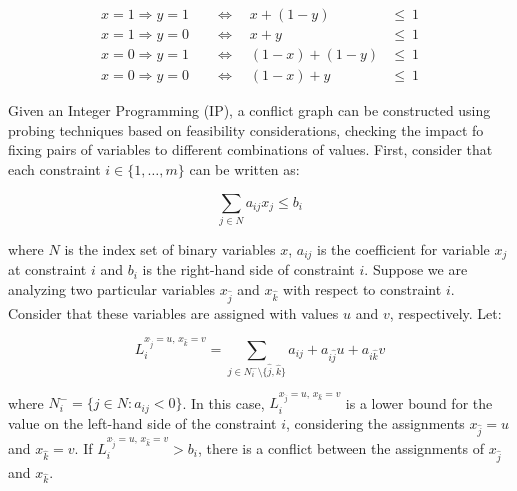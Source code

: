 \documentclass{endm}
\begin{document}
\begin{align}
x = 1 \Rightarrow y = 1 & \quad \Longleftrightarrow \quad x + (1 - y) & \leq \ 1\\
x = 1 \Rightarrow y = 0 & \quad \Longleftrightarrow \quad x + y & \leq \ 1 \\
x = 0 \Rightarrow y = 1 & \quad \Longleftrightarrow \quad (1 - x) + (1 - y) & \leq \ 1 \\
x = 0 \Rightarrow y = 0 & \quad \Longleftrightarrow \quad (1 - x) + y & \leq \ 1
\end{align}

Given an Integer Programming (IP), a conflict graph can be constructed using probing techniques based on feasibility considerations\cite{atamturk,achterberg,sandholm}, checking the impact fo fixing pairs of variables to different combinations of values. First, consider that each constraint $i \in \{1,\ldots,m\}$ can be written as:

\begin{equation}
 \sum_{j \in N} a_{ij}x_{j} \leq b_{i} 
\end{equation}

\noindent where $N$ is the index set of binary variables $x$, $a_{ij}$ is the coefficient for variable $x_{j}$ at constraint $i$ and $b_{i}$ is the right-hand side of constraint $i$. Suppose we are analyzing two particular variables $x_{\hat{j}}$ and $x_{\hat{k}}$ with respect to constraint $i$. Consider that these variables are assigned with values $u$ and $v$, respectively. Let:

\begin{equation}\label{li}
L_{i}^{x_{\hat{j}} = u,\, x_{\hat{k}} = v}=\sum_{j\in N_{i}^{-} \setminus \{\hat{j}, \hat{k}\}}a_{ij}+a_{i\hat{j}}u+a_{i\hat{k}}v 
\end{equation}

\noindent where $N_{i}^{-} = \{j \in N : a_{ij} < 0\}$. In this case, $L_{i}^{x_{\hat{j}} = u,\, x_{\hat{k}} = v}$ is a lower bound for the value on the left-hand side  of the constraint $i$, considering the assignments $x_{\hat{j}} = u$ and $x_{\hat{k}} = v$. If $L_{i}^{x_{\hat{j}} = u,\, x_{\hat{k}} = v} > b_{i}$, there is a conflict between the assignments of $x_{\hat{j}}$ and $x_{\hat{k}}$. 
\end{document}
